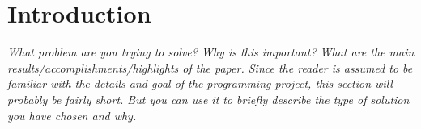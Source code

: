 \section{Introduction}
\label{sec:reusable rockets}
\textit{What problem are you trying to solve? Why is this important? What are the main results/accomplishments/highlights of the paper. Since the reader is assumed to be familiar with the details and goal of the programming project, this section will probably be fairly short. But you can use it to briefly describe the type of solution you have chosen and why.}
